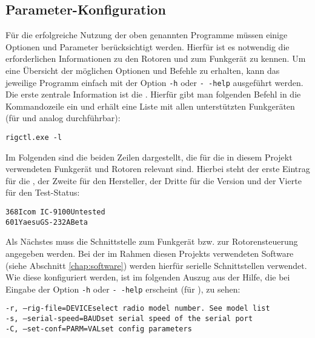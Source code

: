 \subsection{Parameter-Konfiguration}
\label{chap:hamlibconfig}

Für die erfolgreiche Nutzung der oben genannten Programme müssen einige Optionen und Parameter berücksichtigt werden. Hierfür ist es notwendig die erforderlichen Informationen zu den Rotoren und zum Funkgerät zu kennen. Um eine Übersicht der möglichen Optionen und Befehle zu erhalten, kann das jeweilige Programm einfach mit der Option \texttt{-h} oder \texttt{-\,-help} ausgeführt werden.\newpar
Die erste zentrale Information ist die . Hierfür gibt man folgenden Befehl in die Kommandozeile ein und erhält eine Liste mit allen unterstützten Funkgeräten (für  und  analog durchführbar):

\vspace{-1em}
\begin{shaded}
	\texttt{rigctl.exe -l}
\end{shaded}
\vspace{-1em}

Im Folgenden sind die beiden Zeilen dargestellt, die für die in diesem Projekt verwendeten Funkgerät und Rotoren relevant sind. Hierbei steht der erste Eintrag für die , der Zweite für den Hersteller, der Dritte für die Version und der Vierte für den Test-Status:

\vspace{-1em}
\begin{shaded}
	\texttt{368\qquad Icom\qquad\ IC-9100\qquad Untested}\\%
	\texttt{601\qquad Yaesu\qquad GS-232A\qquad Beta}
\end{shaded}
\vspace{-1em}
\label{hamlibbackend}

Als Nächstes muss die Schnittstelle zum Funkgerät bzw. zur Rotorensteuerung angegeben werden. Bei der im Rahmen diesen Projekts verwendeten Software (siehe Abschnitt \ref{chap:software}) werden hierfür serielle Schnittstellen verwendet. Wie diese konfiguriert werden, ist im folgenden Auszug aus der Hilfe, die bei Eingabe der Option \texttt{-h} oder \texttt{-\,-help} erscheint (für ), zu sehen:

\vspace{-1em}
\begin{shaded}
	 \texttt{-r, --rig-file=DEVICE\qquad \qquad select radio model number. See model list} \\%
	 \texttt{-s, --serial-speed=BAUD\qquad\quad set serial speed of the serial port} \\%
	 \texttt{-C, --set-conf=PARM=VAL\qquad \quad set config parameters}
\end{shaded}
\vspace{-1em}

